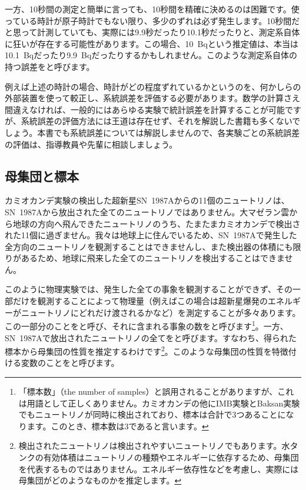 一方、10秒間の測定と簡単に言っても、10秒間を精確に決めるのは困難です。使っている時計が原子時計でもない限り、多少のずれは必ず発生します。10秒間だと思って計測していても、実際には9.9秒だったり10.1秒だったりと、測定系自体に狂いが存在する可能性があります。この場合、10~Bqという推定値は、本当は10.1~Bqだったり9.9~Bqだったりするかもしれません。このような測定系自体の持つ誤差をと呼びます。

例えば上述の時計の場合、時計がどの程度ずれているかというのを、何かしらの外部装置を使って較正し、系統誤差を評価する必要があります。数学の計算さえ間違えなければ、一般的にはあらゆる実験で統計誤差を計算することが可能ですが、系統誤差の評価方法には王道は存在せず、それを解説した書籍も多くないでしょう。本書でも系統誤差については解説しませんので、各実験ごとの系統誤差の評価は、指導教員や先輩に相談しましょう。

\subsection{母集団と標本}

カミオカンデ実験の検出した超新星SN~1987Aからの11個のニュートリノは、SN~1987Aから放出された全てのニュートリノではありません。大マゼラン雲から地球の方向へ飛んできたニュートリノのうち、たまたまカミオカンデで検出された11個に過ぎません。我々は地球上に住んでいるため、SN~1987Aで発生した全方向のニュートリノを観測することはできませんし、また検出器の体積にも限りがあるため、地球に飛来した全てのニュートリノを検出することはできません。

このように物理実験では、発生した全ての事象を観測することができず、その一部だけを観測することによって物理量（例えばこの場合は超新星爆発のエネルギーがニュートリノにどれだけ渡されるかなど）を測定することが多々あります。この一部分のことをと呼び、それに含まれる事象の数をと呼びます\footnote{「標本数」（the number of samples）と誤用されることがありますが、これは用語として正しくありません。カミオカンデの他にIMB実験とBaksan実験でもニュートリノが同時に検出されており、標本は合計で3つあることになります。このとき、標本数は3であると言います。}。一方、SN~1987Aで放出されたニュートリノの全てをと呼びます。すなわち、得られた標本から母集団の性質を推定するわけです\footnote{検出されたニュートリノは検出されやすいニュートリノでもあります。水タンクの有効体積はニュートリノの種類やエネルギーに依存するため、母集団を代表するものではありません。エネルギー依存性などを考慮し、実際には母集団がどのようなものかを推定します。}。このような母集団の性質を特徴付ける変数のことをと呼びます。


